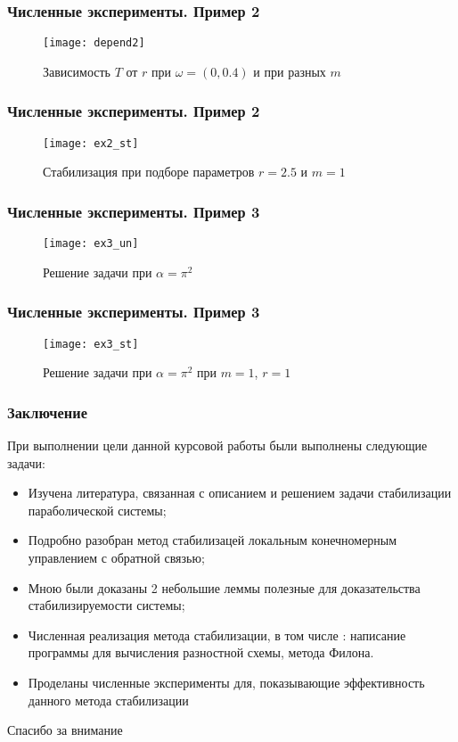 \documentclass{beamer}
\begin{document}
\begin{frame}
\frametitle{Численные эксперименты. Пример 2}

\begin{figure}[H]
  \centering
  \texttt{[image: depend2]}
  \caption{Зависимость $T$ от $r$ при $\omega = (0, 0.4)$ и при разных $m$}
\end{figure}

\end{frame}

\begin{frame}
\frametitle{Численные эксперименты. Пример 2}

\begin{figure}[H]
  \centering
  \texttt{[image: ex2\_st]}
  \def\figurename{рис}
  \caption{Стабилизация при подборе параметров $r = 2.5$ и $m = 1$}
\end{figure}

\end{frame}

\begin{frame}
\frametitle{Численные эксперименты. Пример 3}

\begin{figure}[H]
  \centering
  \texttt{[image: ex3\_un]}
  \def\figurename{рис}
  \caption{Решение задачи при $\alpha = \pi^2$}
\end{figure}


\end{frame}

\begin{frame}
\frametitle{Численные эксперименты. Пример 3}

\begin{figure}[H]
  \centering
  \texttt{[image: ex3\_st]}
  \def\figurename{рис}
  \caption{Решение задачи при $\alpha = \pi^2$ при $m = 1$, $r = 1$}
\end{figure}  
\end{frame}

\begin{frame}
\frametitle{Заключение}

При выполнении цели данной курсовой работы были выполнены следующие задачи:
\begin{itemize}
	\item Изучена литература, связанная с описанием и решением задачи стабилизации параболической системы;
	\item Подробно разобран метод стабилизацей локальным конечномерным управлением с обратной связью;
	\item Мною были доказаны 2 небольшие леммы полезные для доказательства стабилизируемости системы;
	\item Численная реализация метода стабилизации, в том числе : написание программы для вычисления разностной схемы, метода Филона.
	\item Проделаны численные эксперименты для, показывающие эффективность данного метода стабилизации
\end{itemize}

\end{frame}

\begin{frame}
	\begin{center}
	\Huge Спасибо за внимание
	\end{center}
\end{frame}
\end{document}
